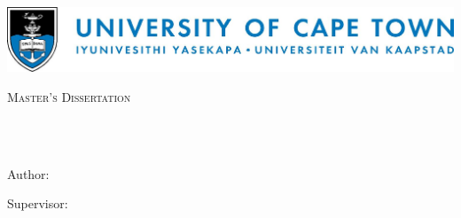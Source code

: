 \documentclass[
12pt, %
english, %
singlespacing, %
parskip, %
headsepline, %
openany,
]{MastersDoctoralThesis} %
\author{Pavan \textsc{Singh}} %
\numberwithin{theorem}{section}
\numberwithin{remark}{section}
\numberwithin{assumption}{section}
\begin{document}
\frontmatter %

\pagestyle{plain} %


\begin{titlepage}
\begin{center}

\includegraphics*[width=\linewidth]{Figures/UCTLogoLong.jpg} 

\vspace*{.06\textheight}
{\scshape\LARGE \univname\par}\vspace{1.0cm} %
\textsc{\Large Master's Dissertation}\\[0.5cm] %

\HRule \\[0.4cm] %
{\large \bfseries \ttitle\par}\vspace{0.4cm} %
\HRule \\[1.5cm] %
 
\begin{minipage}[t]{0.4\textwidth}
\begin{flushleft} \large
{Author:}\\
\authorname
\end{flushleft}
\end{minipage}
\begin{minipage}[t]{0.4\textwidth}
\begin{flushright} \large
{Supervisor:} \\
\supname
\end{flushright}
\end{minipage}\\[1cm]
 
\vfill


\end{center}
\end{titlepage}
\end{document}
